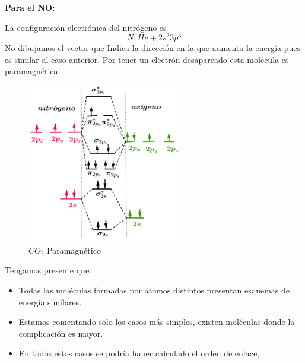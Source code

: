 \textbf{Para el NO:}

La configuración electrónica del nitrógeno es
\begin{equation}
	N: He+ 2s^{2}3p^{3}
\end{equation}
No dibujamos el vector que Indica la dirección en la que aumenta la energía pues es similar al caso anterior.
Por tener un electrón desapareado esta molécula es paramagnética.

\begin{figure}[H]
    \centering
    \includegraphics[width=0.6\textwidth]{./Figures/CO2Paramagnetico}
	\caption{$CO_{2}$ Paramagnético}
	\label{fig:CO2Paramagnetico}
\end{figure}

Tengamos presente que:

\begin{itemize}
	\item Todas las moléculas formadas por átomos distintos presentan esquemas de energía similares.
	\item Estamos comentando solo los casos más simples, existen moléculas donde la complicación es mayor.
	\item En todos estos casos se podría haber calculado el orden de enlace,
\end{itemize}








